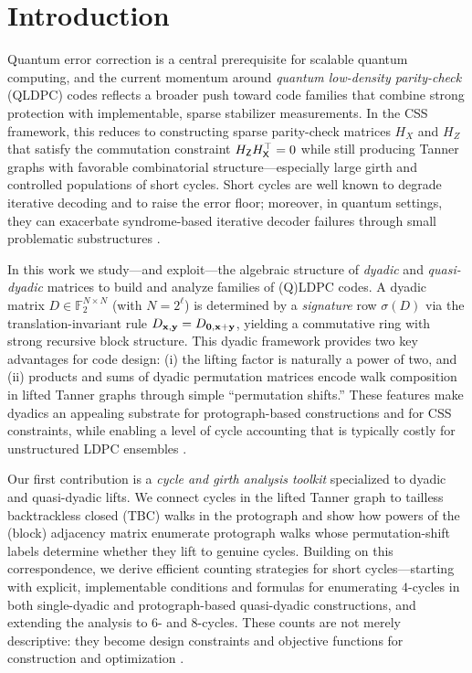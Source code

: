 \documentclass[11pt]{article}
\theoremstyle{plain}
\theoremstyle{plain}
\theoremstyle{definition}
\numberwithin{theo}{section}
\newcommand{\bx}{{\mathbf x}}
\newcommand{\by}{{\mathbf y}}
\newcounter{rom}
\begin{document}

\section{Introduction}
Quantum error correction is a central prerequisite for scalable quantum computing, and the current momentum around \emph{quantum low-density parity-check} (QLDPC) codes reflects a broader push toward code families that combine strong protection with implementable, sparse stabilizer measurements. In the CSS framework, this reduces to constructing sparse parity-check matrices $H_X$ and $H_Z$ that satisfy the commutation constraint $H_{\sf Z}H_{\sf X}^{\top}=0$ while still producing Tanner graphs with favorable combinatorial structure---especially large girth and controlled populations of short cycles. Short cycles are well known to degrade iterative decoding and to raise the error floor; moreover, in quantum settings, they can exacerbate syndrome-based iterative decoder failures through small problematic substructures \cite{dolecek2009analysis,Morris2026AMC}. 

In this work we study---and exploit---the algebraic structure of \emph{dyadic} and \emph{quasi-dyadic} matrices to build and analyze families of (Q)LDPC codes. A dyadic matrix $D\in\mathbb{F}_2^{N\times N}$ (with $N=2^\ell$) is determined by a \emph{signature} row $\sigma(D)$ via the translation-invariant rule $D_{\bx,\by}=D_{{\bf 0},\bx+\by}$, yielding a commutative ring with strong recursive block structure. This dyadic framework provides two key advantages for code design: (i) the lifting factor is naturally a power of two, and (ii) products and sums of dyadic permutation matrices encode walk composition in lifted Tanner graphs through simple ``permutation shifts.'' These features make dyadics an appealing substrate for protograph-based constructions and for CSS constraints, while enabling a level of cycle accounting that is typically costly for unstructured LDPC ensembles \cite{Gulamhusein,mpk24}.

Our first contribution is a \emph{cycle and girth analysis toolkit} specialized to dyadic and quasi-dyadic lifts. We connect cycles in the lifted Tanner graph to tailless backtrackless closed (TBC) walks in the protograph and show how powers of the (block) adjacency matrix enumerate protograph walks whose permutation-shift labels determine whether they lift to genuine cycles. Building on this correspondence, we derive efficient counting strategies for short cycles---starting with explicit, implementable conditions and formulas for enumerating $4$-cycles in both single-dyadic and protograph-based quasi-dyadic constructions, and extending the analysis to $6$- and $8$-cycles. These counts are not merely descriptive: they become design constraints and objective functions for construction and optimization \cite{gfsm23b, gfsm23c}.
\end{document}
